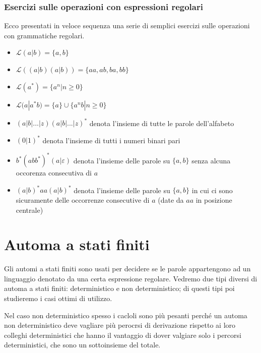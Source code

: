 \documentclass[class=book, crop=false, oneside, 12pt]{standalone}
\begin{document}
\subsubsection{Esercizi sulle operazioni con espressioni regolari}
Ecco presentati in veloce sequenza una serie di semplici esercizi sulle operazioni con grammatiche regolari. 
\begin{itemize}
    \item \(\mathcal{L}(a | b) = \{a, b\}\)
    \item \(\mathcal{L}((a | b) (a | b)) = \{aa, ab, ba, bb\}\)
    \item \(\mathcal{L}(a^*) = \{a^n | n \ge 0\}\)
    \item \(\mathcal{L}(a | a^* b) = \{a\} \cup \{a^n b | n \ge 0\}\)
    \item \( (a|b|...|z)(a|b|...|z)^* \) denota l’insieme di tutte le parole dell’alfabeto
    \item \( (0|1)^* \) denota l’insieme di tutti i numeri binari pari
    \item \( b^*( abb^* )^* ( a | \varepsilon ) \) denota l’insieme delle parole su \(\{a,b\} \) senza alcuna occorenza consecutiva di \(a\)
    \item \( (a|b)^* aa(a|b)^* \) denota l’insieme delle parole su \( \{a,b\} \) in cui ci sono sicuramente delle occorrenze consecutive di \(a\) (date da \(aa\) in posizione centrale)
\end{itemize}


\section{Automa a stati finiti}
Gli automi a stati finiti sono usati per decidere se le parole appartengono ad un linguaggio denotato da una certa espressione regolare.
Vedremo due tipi diversi di automa a stati finiti: deterministico e non deterministico; di questi tipi poi studieremo i casi ottimi di utilizzo.

Nel caso non deterministico spesso i cacloli sono più pesanti perché un automa non deterministico deve vagliare più perocrsi di derivazione rispetto ai loro colleghi deterministici che hanno il vantaggio di dover valgiare solo i percorsi deterministici, che sono un sottoinsieme del totale.
\end{document}
